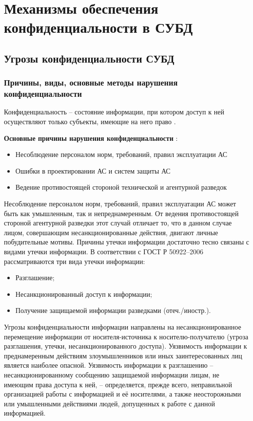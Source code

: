 \section{Механизмы обеспечения конфиденциальности в СУБД}
\subsection{Угрозы конфиденциальности СУБД}

\subsubsection{Причины, виды, основные методы нарушения конфиденциальности}

Конфиденциальность – состояние информации, при котором доступ к ней осуществляют только субъекты,
имеющие на него право \cite{crypto-methods} .

\textbf {Основные причины нарушения конфиденциальности} \cite{o-salo}:
\begin{itemize}
    \item Несоблюдение персоналом норм, требований, правил эксплуатации АС
    \item Ошибки в проектировании АС и систем защиты АС
    \item Ведение противостоящей стороной технической и агентурной разведок
\end{itemize}

Несоблюдение персоналом норм, требований, правил эксплуатации АС может быть как умышленным, так и непреднамеренным. От ведения противостоящей стороной агентурной разведки этот случай отличает то, что в данном случае лицом, совершающим несанкционированные действия, двигают личные побудительные мотивы. Причины утечки информации достаточно тесно связаны с видами утечки информации. В соответствии с ГОСТ Р 50922–2006 \cite{GOST50922} рассматриваются три вида утечки информации:

\begin{itemize}
    \item Разглашение;
    \item Несанкционированный доступ к информации;
    \item Получение защищаемой информации разведками (отеч./иностр.).
\end{itemize}

Угрозы конфиденциальности информации направлены на несанкционированное перемещение информации от
носителя-источника к носителю-получателю (угроза разглашения, утечки, несанкционированного доступа).
Уязвимость информации к преднамеренным действиям злоумышленников или иных заинтересованных лиц является
наиболее опасной.
Уязвимость информации к разглашению – несанкционированному сообщению защищаемой информации лицам, не имеющим
права доступа к ней, – определяется, прежде всего, неправильной организацией работы с информацией и её
носителями, а также неосторожными или умышленными действиями людей, допущенных к работе с данной информацией.

